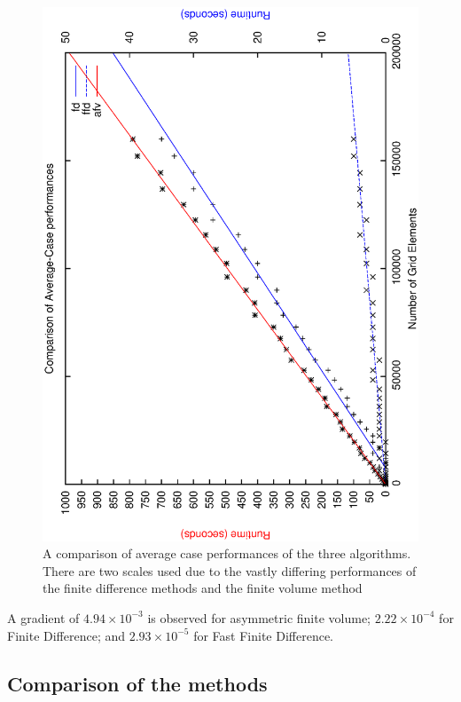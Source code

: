 \documentclass[aps,twocolumn,pre,nofootinbib,10pt]{revtex4-1}
\begin{document}
\begin{figure}
    \caption{A comparison of average case performances of the three algorithms. There are two scales used due to the vastly differing performances of the finite difference methods and the finite volume method}
    \label{fig:acalgcomp}
    \includegraphics*[angle=-90,width=\columnwidth]{comparison_ac.ps}
\end{figure}


A gradient of $4.94 \times 10^{-3}$ is observed for asymmetric finite volume; $2.22 \times 10^{-4}$ for Finite Difference; and $2.93 \times 10^{-5}$ for Fast Finite Difference.

\subsection{Comparison of the methods}
\end{document}
